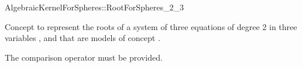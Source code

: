 \begin{ccRefConcept}{AlgebraicKernelForSpheres::RootForSpheres_2_3}

\ccDefinition

Concept to represent the roots of a system of three equations of degree 2
in three variables ,  and  that are models of concept
.



\ccOperations

The comparison operator \ccc{==} must be provided. 


\ccHasModels


\ccSeeAlso


\end{ccRefConcept}

